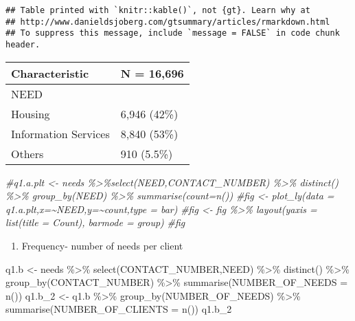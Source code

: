 \documentclass[
]{article}
\newenvironment{Shaded}{\begin{snugshade}}{\end{snugshade}}
\newcommand{\AttributeTok}[1]{\textcolor[rgb]{0.77,0.63,0.00}{#1}}
\newcommand{\CommentTok}[1]{\textcolor[rgb]{0.56,0.35,0.01}{\textit{#1}}}
\newcommand{\FunctionTok}[1]{\textcolor[rgb]{0.00,0.00,0.00}{#1}}
\newcommand{\NormalTok}[1]{#1}
\newcommand{\OtherTok}[1]{\textcolor[rgb]{0.56,0.35,0.01}{#1}}
\newcommand{\SpecialCharTok}[1]{\textcolor[rgb]{0.00,0.00,0.00}{#1}}
\providecommand{\tightlist}{%
  \setlength{\itemsep}{0pt}\setlength{\parskip}{0pt}}
\begin{document}
\begin{verbatim}
## Table printed with `knitr::kable()`, not {gt}. Learn why at
## http://www.danieldsjoberg.com/gtsummary/articles/rmarkdown.html
## To suppress this message, include `message = FALSE` in code chunk header.
\end{verbatim}

\begin{longtable}[]{@{}ll@{}}
\toprule
\textbf{Characteristic} & \textbf{N = 16,696} \\
\midrule
\endhead
NEED & \\
Housing & 6,946 (42\%) \\
Information Services & 8,840 (53\%) \\
Others & 910 (5.5\%) \\
\bottomrule
\end{longtable}

\begin{Shaded}
\begin{Highlighting}[]
\CommentTok{\#q1.a.plt \textless{}{-} needs \%\textgreater{}\%select(NEED,CONTACT\_NUMBER) \%\textgreater{}\% distinct() \%\textgreater{}\% group\_by(NEED) \%\textgreater{}\% summarise(count=n())}
\CommentTok{\#fig \textless{}{-} plot\_ly(data = q1.a.plt,x=\textasciitilde{}NEED,y=\textasciitilde{}count,type = \textquotesingle{}bar\textquotesingle{})}
\CommentTok{\#fig \textless{}{-} fig \%\textgreater{}\% layout(yaxis = list(title = \textquotesingle{}Count\textquotesingle{}), barmode = \textquotesingle{}group\textquotesingle{})}
\CommentTok{\#fig}
\end{Highlighting}
\end{Shaded}

\begin{enumerate}
\def\labelenumi{\alph{enumi}.}
\setcounter{enumi}{1}
\tightlist
\item
  Frequency- number of needs per client
\end{enumerate}

\begin{Shaded}
\begin{Highlighting}[]
\NormalTok{q1.b }\OtherTok{\textless{}{-}}\NormalTok{ needs }\SpecialCharTok{\%\textgreater{}\%} \FunctionTok{select}\NormalTok{(CONTACT\_NUMBER,NEED) }\SpecialCharTok{\%\textgreater{}\%} \FunctionTok{distinct}\NormalTok{() }\SpecialCharTok{\%\textgreater{}\%} \FunctionTok{group\_by}\NormalTok{(CONTACT\_NUMBER) }\SpecialCharTok{\%\textgreater{}\%} \FunctionTok{summarise}\NormalTok{(}\AttributeTok{NUMBER\_OF\_NEEDS =} \FunctionTok{n}\NormalTok{())}
\NormalTok{q1.b\_2 }\OtherTok{\textless{}{-}}\NormalTok{ q1.b }\SpecialCharTok{\%\textgreater{}\%} \FunctionTok{group\_by}\NormalTok{(NUMBER\_OF\_NEEDS) }\SpecialCharTok{\%\textgreater{}\%} \FunctionTok{summarise}\NormalTok{(}\AttributeTok{NUMBER\_OF\_CLIENTS =} \FunctionTok{n}\NormalTok{()) }
\NormalTok{q1.b\_2}
\end{Highlighting}
\end{Shaded}
\end{document}
